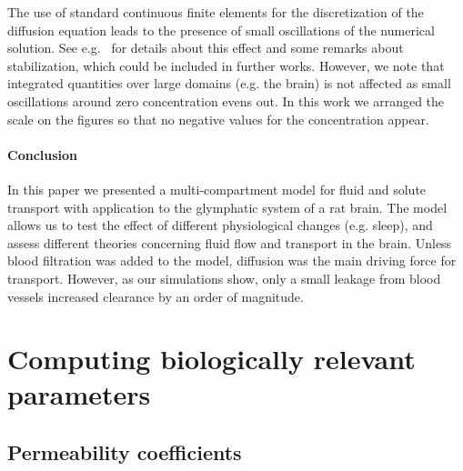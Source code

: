 \documentclass[10pt]{article}
\newcommand{\1}{^{(1)}}
\newcommand{\2}{^{(2)}}
\begin{document}
The use of standard continuous finite elements for the discretization of the diffusion equation leads to the presence of small oscillations of the numerical solution. See e.g.~\cite{Mardal-2022-mri} for details about this effect and some remarks about stabilization, which could be included in further works. However, we note that integrated quantities over large domains (e.g. the brain) is not affected as small oscillations around zero concentration evens out. In this work we arranged the scale on the figures so that no negative values for the concentration appear. 


\paragraph{Conclusion}
In this paper we presented a multi-compartment model for fluid and solute transport with application to the glymphatic system of a rat brain. The model allows us to test the effect of different physiological changes (e.g. sleep), and assess different theories concerning fluid flow and transport in the brain. Unless blood filtration was added to the model, diffusion was the main driving force for transport. However, as our simulations show, only a small leakage from blood vessels increased clearance by an order of magnitude. 


\appendix


\section{Computing biologically relevant parameters} \label{app:param-values}
\subsection{Permeability coefficients}
\end{document}
